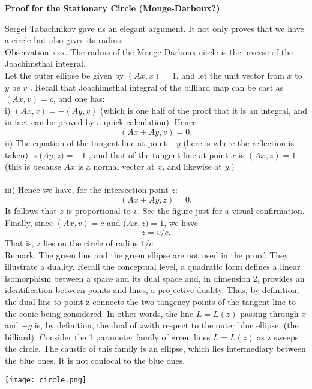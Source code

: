 \documentclass[11pt]{article}
\begin{document}
\begin{center}
{\bf {\large
Proof for the Stationary Circle  (Monge-Darboux?)}}
\end{center}

Sergei Tabachnikov gave us an elegant argument.  It not only proves that we have a circle but also gives its radius: \\

\noindent  Observation xxx.   The radius of the Monge-Darboux circle  is the inverse
of the Joachimsthal integral. \\ 

Let the outer ellipse be given by $(Ax,x)=1$, and let the unit vector from $x$ to $y$ be $v$ .  Recall that Joachimsthal integral of the billiard map can be cast as $(Ax,v)=c$, and one has:\\

i)  $(Ax,v) = -(Ay,v)$   (which is one half of the proof that it is an integral, and  in fact can be proved by a quick calculation). Hence 
$$ (Ax+Ay,v)=0.$$
ii) The equation of the tangent line at point  $-y$  (here is where the reflection is taken)  is ($Ay,z)=-1$ , and that of the tangent line at point $x$ is $(Ax,z)=1$
 (this is because $Ax$ is a normal vector at $x$, and likewise at $y$.) \\ \\
iii)  Hence we have, for the intersection point $z$:  
$$ (Ax+Ay,z)=0. $$
It follows that $z$ is proportional to $v$.  See the figure just for a visual confirmation.
Finally,  since $(Ax,v)=c$ and ($Ax,z)=1$, we have
$$ z = v/c .$$
That is, $z$ lies on the circle of radius $1/c$.\\

{\small
\noindent  Remark.  The green line and  the green ellipse are not used in the proof.  They  illustrate a duality.
Recall  the conceptual level, a quadratic form defines a linear isomorphism between a space and its dual space and, in dimension 2, 
 provides an identification between points and lines, a projective duality.
Thus, by definition, the dual line to point z connects the two tangency points of the tangent line to the  conic
being considered. %
In other words, the line 
$ L = L(z) $  passing through $ x$ and  $-y$ is, by definition, the dual of $ z $with respect to the outer blue ellipse.
 (the billiard). %
 Consider the 1 parameter family of green lines $L = L(z)$ as z sweeps the circle. 
 The caustic of this family is an ellipse, which lies intermediary between the blue ones. It is not  confocal to the blue ones. }

 
 
  \centering
 \texttt{[image: circle.png]}
\end{document}
